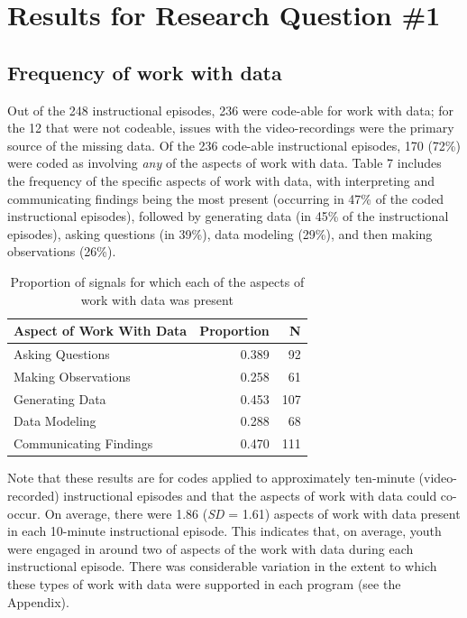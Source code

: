 \documentclass[]{msu-thesis}
\theoremstyle{definition}
\theoremstyle{definition}
\theoremstyle{definition}
\theoremstyle{remark}
\begin{document}
\section{Results for Research Question
\#1}\label{results-for-research-question-1}

\subsection{Frequency of work with
data}\label{frequency-of-work-with-data}

Out of the 248 instructional episodes, 236 were code-able for work with
data; for the 12 that were not codeable, issues with the
video-recordings were the primary source of the missing data. Of the 236
code-able instructional episodes, 170 (72\%) were coded as involving
\emph{any} of the aspects of work with data. Table 7 includes the
frequency of the specific aspects of work with data, with interpreting
and communicating findings being the most present (occurring in 47\% of
the coded instructional episodes), followed by generating data (in 45\%
of the instructional episodes), asking questions (in 39\%), data
modeling (29\%), and then making observations (26\%).

\begin{table}

\caption{\label{tab:unnamed-chunk-9}Proportion of signals for which each of the aspects of work with data was present}
\centering
\begin{tabular}[t]{lrr}
\toprule
Aspect of Work With Data & Proportion & N\\
\midrule
Asking Questions & 0.389 & 92\\
Making Observations & 0.258 & 61\\
Generating Data & 0.453 & 107\\
Data Modeling & 0.288 & 68\\
Communicating Findings & 0.470 & 111\\
\bottomrule
\end{tabular}
\end{table}

Note that these results are for codes applied to approximately
ten-minute (video-recorded) instructional episodes and that the aspects
of work with data could co-occur. On average, there were 1.86 (\emph{SD}
= 1.61) aspects of work with data present in each 10-minute
instructional episode. This indicates that, on average, youth were
engaged in around two of aspects of the work with data during each
instructional episode. There was considerable variation in the extent to
which these types of work with data were supported in each program (see
the Appendix).
\end{document}
